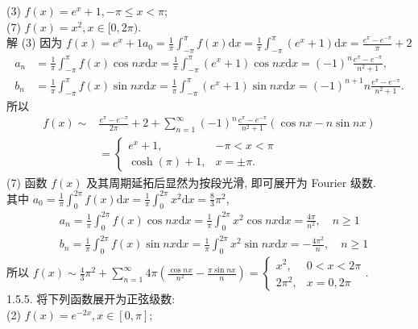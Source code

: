 \documentclass[a4paper,11pt,UTF8]{article}
\begin{document}
(3) $\displaystyle f(x)=e^x+1,-\pi \leq x<\pi$;\\
(7) $\displaystyle f(x)=x^2, x \in[0,2 \pi)$.\\
解 (3) 因为 $\displaystyle f(x)=e^x+1 a_0=\frac{1}{\pi} \int_{-\pi}^\pi f(x) \mathrm{d}x=\frac{1}{\pi} \int_{-\pi}^\pi\left(e^x+1\right) \mathrm{d}x=	\frac{e^\pi-e^{-\pi}}{\pi}  +2$
$$
\begin{aligned}
	a_n & =\frac{1}{\pi} \int_{-\pi}^\pi f(x) \cos n x \mathrm{d}x=\frac{1}{\pi} \int_{-\pi}^\pi\left(e^x+1\right) \cos n x \mathrm{d}x=(-1)^n \frac{e^\pi-e^{-\pi}}{n^2+1}, \\
	b_n & =\frac{1}{\pi} \int_{-\pi}^\pi f(x) \sin n x \mathrm{d}x=\frac{1}{\pi} \int_{-\pi}^\pi\left(e^x+1\right) \sin n x \mathrm{d}x=(-1)^{n+1} n \frac{e^\pi-e^{-\pi}}{n^2+1} .
\end{aligned}
$$
所以
$$
\begin{aligned}
	f(x) \sim & \frac{e^\pi-e^{-\pi}}{2 \pi}+2+\sum_{n=1}^{\infty}(-1)^n \frac{e^\pi-e^{-\pi}}{n^2+1}(\cos n x-n \sin n x) \\
	& = \begin{cases}e^x+1, & -\pi<x<\pi \\
		\cosh (\pi)+1, & x= \pm \pi .\end{cases}
\end{aligned}
$$
(7) 函数 $\displaystyle f(x)$ 及其周期延拓后显然为按段光滑, 即可展开为 Fourier 级数.\\
其中 $\displaystyle a_0=\frac{1}{\pi} \int_0^{2 \pi} f(x) \mathrm{d}x=\frac{1}{\pi} \int_0^{2 \pi} x^2 \mathrm{d}x=\frac{8}{3} \pi^2$,
$$
\begin{aligned}
	& a_n=\frac{1}{\pi} \int_0^{2 \pi} f(x) \cos n x \mathrm{d}x=\frac{1}{\pi} \int_0^{2 \pi} x^2 \cos n x \mathrm{d}x=\frac{4 \pi}{n^2}, \quad n \geq 1 \\
	& b_n=\frac{1}{\pi} \int_0^{2 \pi} f(x) \sin n x \mathrm{d}x=\frac{1}{\pi} \int_0^{2 \pi} x^2 \sin n x \mathrm{d}x=-\frac{4 \pi^2}{n}, \quad n \geq 1
\end{aligned}
$$
所以 $\displaystyle f(x) \sim \frac{4}{3} \pi^2+\sum_{n=1}^{\infty} 4 \pi\left(\frac{\cos n x}{n^2}-\frac{\pi \sin n x}{n}\right)=\left\{\begin{array}{ll}x^2, & 0<x<2 \pi \\ 2 \pi^2, & x=0,2 \pi\end{array}\right.$.\\
1.5.5. 将下列函数展开为正弦级数:\\
(2) $\displaystyle f(x)=e^{-2 x}, x \in[0, \pi]$;\\
\end{document}
